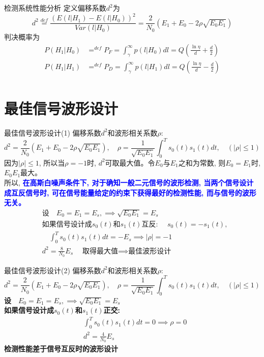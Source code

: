 \begin{frame}{检测系统性能分析}
定义偏移系数$d^2$为
\[d^2\mathop{=}\limits^{def}\frac{(E(l|H_1)-E(l|H_0))^2}{Var(l|H_0)}=\frac{2}{N_0}(E_1+E_0-2\rho\sqrt{E_0E_1}) \]
判决概率为
\begin{align*}
P(H_1|H_0)&\mathop{=}^{def}P_F=\int_{\gamma}^{\infty}p(l|H_0)dl=Q\left(\frac{\ln\eta}{d}+\frac{d}{2}\right)\\
P(H_1|H_1)&\mathop{=}^{def}P_D=\int_{\gamma}^{\infty}p(l|H_1)dl=Q\left(\frac{\ln\eta}{d}-\frac{d}{2}\right)\\
\end{align*}
\end{frame}

\section{最佳信号波形设计}

\begin{frame}[shrink]{最佳信号波形设计(1)}
偏移系数$d^2$和波形相关系数$\rho$:
\[d^2=\frac{2}{N_0}(E_1+E_0-2\rho\sqrt{E_0E_1}),\quad \rho=\frac{1}{\sqrt{E_{0}E_{1}}}\int_{0}^{T}s_0(t)s_1(t)dt,\quad(|\rho|\le 1) \]
因为$|\rho|\le 1$, 所以当$\rho=-1$时, $d^2$可取最大值。令$E_0$与$E_1$之和为常数, 则$E_0=E_1$时, $E_0E_1$最大。\\
所以, \textbf{\textcolor{blue}{在高斯白噪声条件下, 对于确知一般二元信号的波形检测, 当两个信号设计成互反信号时, 可在信号能量给定的约束下获得最好的检测性能, 而与信号的波形无关。}}
\begin{align*}
&\textbf{设}\quad E_0=E_1=E_s,\implies\sqrt{E_0E_1}=E_s\\
&\textbf{如果信号设计成$s_0(t)$和$s_1(t)$互反: }\quad s_0(t)=-s_1(t),\\
&\quad\int_{0}^{T}s_0(t)s_1(t)dt=-E_s\implies |\rho|=-1\\
&d^2=\frac{8}{N_0}E_s\quad\textbf{取得最大值$\implies$最佳波形设计}
\end{align*}
\end{frame}

\begin{frame}{最佳信号波形设计(2)}
偏移系数$d^2$和波形相关系数$\rho$:
\[d^2=\frac{2}{N_0}(E_1+E_0-2\rho\sqrt{E_0E_1}),\quad \rho=\frac{1}{\sqrt{E_{0}E_{1}}}\int_{0}^{T}s_0(t)s_1(t)dt,\quad(|\rho|\le 1) \]
\textbf{设}$\quad E_0=E_1=E_s,\implies\sqrt{E_0E_1}=E_s$\\
\textbf{如果信号设计成$s_0(t)$和$s_1(t)$正交:}
 \begin{align*}
 &\int_{0}^{T}s_0(t)s_1(t)dt=0 \implies \rho=0 \\
 &d^2=\frac{4}{N_0}E_s
 \end{align*}
\textbf{检测性能差于信号互反时的波形设计}
\end{frame}

